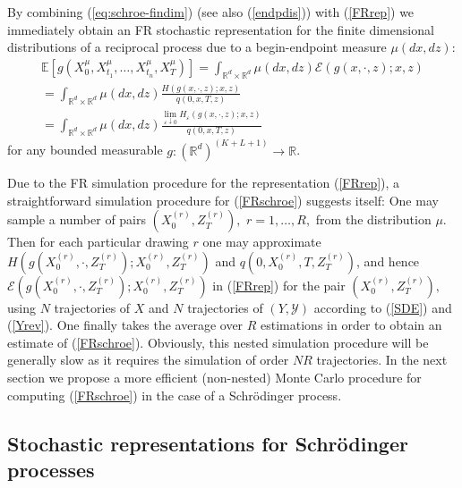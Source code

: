 \documentclass[a4paper,11pt]{amsart}
\theoremstyle{plain}
\theoremstyle{remark}
\begin{document}
By combining (\ref{eq:schroe-findim}) (see also (\ref{endpdis})) with (\ref{FRrep}) we
immediately obtain an FR stochastic representation for the finite dimensional
distributions of a reciprocal process due to a begin-endpoint measure
$\mu(dx,dz)$:%
\begin{multline}
\mathbb{E}\left[  g(X_{0}^{\mu},X_{t_{1}}^{\mu},\ldots,X_{t_{n}}^{\mu}%
,X_{T}^{\mu})\right]  =\int_{\mathbb{R}^{d}\times\mathbb{R}^{d}}%
\mu(dx,dz)\mathcal{E}(g(x,\cdot,z);x,z)\label{FRschroe}\\
=\int_{\mathbb{R}^{d}\times\mathbb{R}^{d}}\mu(dx,dz)\frac{H(g(x,\cdot
,z);x,z)}{q(0,x,T,z)}\\
=\int_{\mathbb{R}^{d}\times\mathbb{R}^{d}}\mu(dx,dz)\frac{\lim_{\varepsilon
\downarrow0}H_{\varepsilon}(g(x,\cdot,z);x,z)}{q(0,x,T,z)}%
\end{multline}
for any bounded measurable $g:\left(  \mathbb{R}^{d}\right)  ^{(K+L+1)}%
\rightarrow\mathbb{R}$.

Due to the FR simulation procedure for the representation (\ref{FRrep}),
a straightforward simulation procedure for (\ref{FRschroe}) suggests itself:
One may sample a number of pairs $(X_{0}^{(r)},Z_{T}^{(r)}),$ $r=1,\ldots,R,$
from the distribution $\mu.$ Then for each particular drawing $r$ one may
approximate $H(g(X_{0}^{(r)},\cdot,Z_{T}^{(r)});X_{0}^{(r)},Z_{T}^{(r)})$ and
$q(0,X_{0}^{(r)},T,Z_{T}^{(r)})$, and hence $\mathcal{E}(g(X_{0}^{(r)}%
,\cdot,Z_{T}^{(r)});X_{0}^{(r)},Z_{T}^{(r)})$ in (\ref{FRrep}) for the pair
$(X_{0}^{(r)},Z_{T}^{(r)}),$ using $N$ trajectories of $X$ and $N$
trajectories of $(Y,\mathcal{Y})$ according to (\ref{SDE}) and (\ref{Yrev}).
One finally takes the average over $R$ estimations in order to obtain an
estimate of (\ref{FRschroe}). Obviously, this nested simulation procedure will
be generally slow as it requires the simulation of order $NR$ trajectories. In
the next section we propose a more efficient (non-nested) Monte Carlo procedure
for computing (\ref{FRschroe}) in the case of a Schr\"odinger process.

\subsection{Stochastic representations for Schr\"{o}dinger processes}
\end{document}
